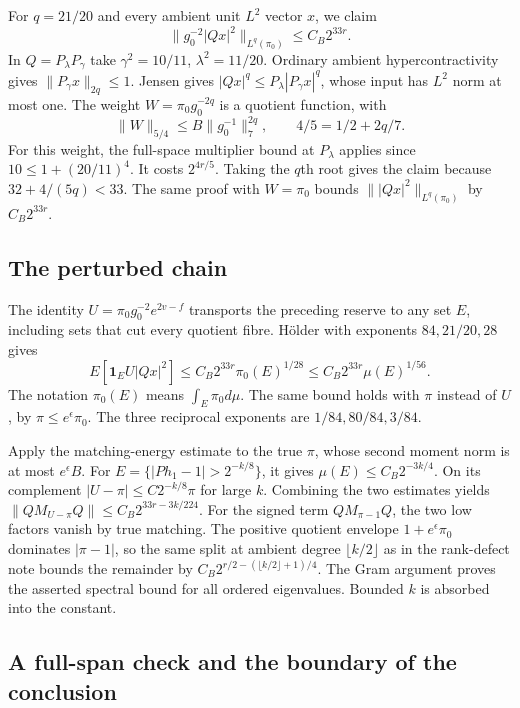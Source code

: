 \documentclass[11pt]{article}
\begin{document}
For \(q=21/20\) and every ambient unit \(L^2\) vector \(x\), we claim
\[
 \|g_0^{-2}|Qx|^2\|_{L^q(\pi_0)}\le C_B 2^{33r}.
\]
In \(Q=P_\lambda P_\gamma\) take \(\gamma^2=10/11\), \(\lambda^2=11/20\). Ordinary ambient hypercontractivity gives \(\|P_\gamma x\|_{2q}\le1\). Jensen gives \(|Qx|^q\le P_\lambda |P_\gamma x|^q\), whose input has \(L^2\) norm at most one. The weight \(W=\pi_0g_0^{-2q}\) is a quotient function, with
\[
 \|W\|_{5/4}\le B\|g_0^{-1}\|_7^{2q},
 \qquad 4/5=1/2+2q/7 .
\]
For this weight, the full-space multiplier bound at \(P_\lambda\) applies since \(10\le1+(20/11)^4\). It costs \(2^{4r/5}\). Taking the \(q\)th root gives the claim because \(32+4/(5q)<33\). The same proof with \(W=\pi_0\) bounds \(\||Qx|^2\|_{L^q(\pi_0)}\) by \(C_B2^{33r}\).

\subsection{The perturbed chain}

The identity \(U=\pi_0g_0^{-2}e^{2v-f}\) transports the preceding reserve to any set \(E\), including sets that cut every quotient fibre. Hölder with exponents \(84,21/20,28\) gives
\[
 E[\mathbf1_E U |Qx|^2]\le C_B 2^{33r}\pi_0(E)^{1/28}
 \le C_B2^{33r}\mu(E)^{1/56}.
\]
The notation \(\pi_0(E)\) means \(\int_E\pi_0d\mu\). The same bound holds with \(\pi\) instead of \(U\), by \(\pi\le e^\epsilon\pi_0\). The three reciprocal exponents are \(1/84,80/84,3/84\).

Apply the matching-energy estimate to the true \(\pi\), whose second moment norm is at most \(e^\epsilon B\). For \(E=\{|Ph_1-1|>2^{-k/8}\}\), it gives \(\mu(E)\le C_B 2^{-3k/4}\). On its complement \(|U-\pi|\le C 2^{-k/8}\pi\) for large \(k\). Combining the two estimates yields \(\|QM_{U-\pi}Q\|\le C_B 2^{33r-3k/224}\). For the signed term \(QM_{\pi-1}Q\), the two low factors vanish by true matching. The positive quotient envelope \(1+e^\epsilon\pi_0\) dominates \(|\pi-1|\), so the same split at ambient degree \(\lfloor k/2\rfloor\) as in the rank-defect note bounds the remainder by \(C_B2^{r/2-(\lfloor k/2\rfloor+1)/4}\). The Gram argument proves the asserted spectral bound for all ordered eigenvalues. Bounded \(k\) is absorbed into the constant.

\subsection{A full-span check and the boundary of the conclusion}
\end{document}
